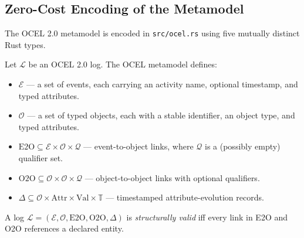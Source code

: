 \subsection{Zero-Cost Encoding of the Metamodel}

The OCEL 2.0 metamodel is encoded in \texttt{src/ocel.rs} using five mutually distinct
Rust types.

\begin{definition}
\label{def:ocel-formal}
Let $\mathcal{L}$ be an OCEL 2.0 log. The OCEL metamodel defines:
\begin{itemize}
  \item $\mathcal{E}$ --- a set of events, each carrying an activity name, optional
        timestamp, and typed attributes.
  \item $\mathcal{O}$ --- a set of typed objects, each with a stable identifier,
        an object type, and typed attributes.
  \item $\text{E2O} \subseteq \mathcal{E} \times \mathcal{O} \times \mathcal{Q}$ ---
        event-to-object links, where $\mathcal{Q}$ is a (possibly empty) qualifier set.
  \item $\text{O2O} \subseteq \mathcal{O} \times \mathcal{O} \times \mathcal{Q}$ ---
        object-to-object links with optional qualifiers.
  \item $\Delta \subseteq \mathcal{O} \times \text{Attr} \times \text{Val} \times
        \mathbb{T}$ --- timestamped attribute-evolution records.
\end{itemize}
A log $\mathcal{L} = (\mathcal{E}, \mathcal{O}, \text{E2O}, \text{O2O}, \Delta)$ is
\emph{structurally valid} iff every link in E2O and O2O references a declared entity.
\end{definition}

